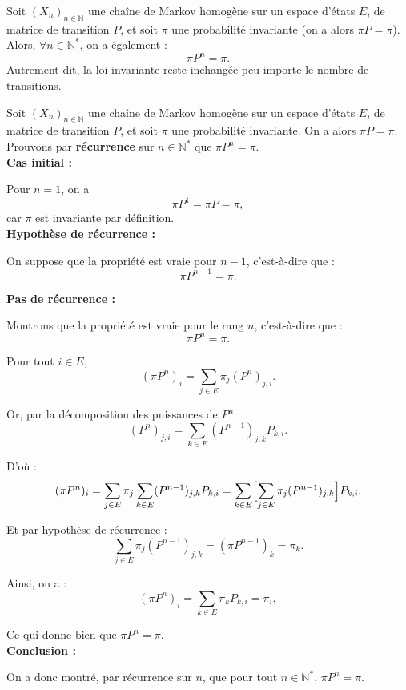 \documentclass{article}
\begin{document}
\begin{tcolorbox}[colback=white,colframe=blue!80!black,title={Invariance aux puissances de la matrice}]
Soit $(X_n)_{n\in\mathbb{N}}$ une chaîne de Markov homogène sur un espace d'états $E$, de matrice de transition $P$, et soit $\pi$ une probabilité invariante (on a alors $\pi P = \pi$). \\

Alors, $\forall n \in \mathbb{N}^{*}$, on a également :
\[
\pi P^n = \pi.
\]
Autrement dit, la loi invariante reste inchangée peu importe le nombre de transitions.
\end{tcolorbox}

\begin{tcolorbox}[colback=white,colframe=green!80!black,title=Démonstration,breakable]
Soit $(X_n)_{n\in\mathbb{N}}$ une chaîne de Markov homogène sur un espace d'états $E$, de matrice de transition $P$, et soit $\pi$ une probabilité invariante.
On a alors $\pi P = \pi$. \\

Prouvons par \textbf{récurrence} sur $n \in \mathbb{N}^*$ que $\pi P^n = \pi$. \\

\textbf{Cas initial :}

Pour $n=1$, on a
\[
  \pi P^1 = \pi P = \pi,
\]
car $\pi$ est invariante par définition. \\

\textbf{Hypothèse de récurrence :}

On suppose que la propriété est vraie pour $n-1$, c'est-à-dire que :
\[
  \pi P^{n-1} = \pi.
\]

\textbf{Pas de récurrence :}

Montrons que la propriété est vraie pour le rang $n$, c'est-à-dire que :
\[
  \pi P^n = \pi.
\]

Pour tout $i \in E$,
\[
  (\pi P^n)_i = \sum_{j \in E} \pi_j (P^n)_{j,i}.
\]

Or, par la décomposition des puissances de $P^n$ :
\[
  (P^n)_{j,i} = \sum_{k \in E} (P^{n-1})_{j,k} P_{k,i}.
\]

D'où :
\[
  (\pi P^n)_i
  = \sum_{j \in E} \pi_j \sum_{k \in E} (P^{n-1})_{j,k} P_{k,i}
  = \sum_{k \in E} \Bigl[\sum_{j \in E} \pi_j (P^{n-1})_{j,k}\Bigr] P_{k,i}.
\]

Et par hypothèse de récurrence :
\[
  \sum_{j \in E} \pi_j (P^{n-1})_{j,k}
  = (\pi P^{n-1})_k
  = \pi_k.
\]

Ainsi, on a :
\[
  (\pi P^n)_i
  = \sum_{k \in E} \pi_k P_{k,i}
  = \pi_i,
\]

Ce qui donne bien que $\pi P^n = \pi$. \\

\textbf{Conclusion :}

On a donc montré, par récurrence sur $n$, que pour tout $n \in \mathbb{N}^*$, $\pi P^n = \pi$.
\end{tcolorbox}
\end{document}
